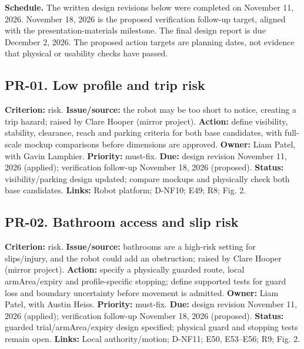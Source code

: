 \documentclass[12pt,letterpaper]{article}
\begin{document}
\textbf{Schedule.} The written design revisions below were completed on November 11, 2026. November 18, 2026 is the proposed verification follow-up target, aligned with the presentation-materials milestone. The final design report is due December 2, 2026. The proposed action targets are planning dates, not evidence that physical or usability checks have passed.

\begin{minipage}{\linewidth}
\subsection*{PR-01. Low profile and trip risk}
\textbf{Criterion:} risk. \textbf{Issue/source:} the robot may be too short to notice, creating a trip hazard; raised by Clare Hooper (mirror project). \textbf{Action:} define visibility, stability, clearance, reach and parking criteria for both base candidates, with full-scale mockup comparisons before dimensions are approved. \textbf{Owner:} Liam Patel, with Gavin Lamphier. \textbf{Priority:} must-fix. \textbf{Due:} design revision November 11, 2026 (applied); verification follow-up November 18, 2026 (proposed). \textbf{Status:} visibility/parking design updated; compare mockups and physically check both base candidates. \textbf{Links:} Robot platform; D-NF10; E49; R8; Fig. 2.
\end{minipage}\par\medskip

\begin{minipage}{\linewidth}
\subsection*{PR-02. Bathroom access and slip risk}
\textbf{Criterion:} risk. \textbf{Issue/source:} bathrooms are a high-risk setting for slips/injury, and the robot could add an obstruction; raised by Clare Hooper (mirror project). \textbf{Action:} specify a physically guarded route, local armArea/expiry and profile-specific stopping; define supported tests for guard loss and boundary uncertainty before movement is admitted. \textbf{Owner:} Liam Patel, with Austin Heiss. \textbf{Priority:} must-fix. \textbf{Due:} design revision November 11, 2026 (applied); verification follow-up November 18, 2026 (proposed). \textbf{Status:} guarded trial/armArea/expiry design specified; physical guard and stopping tests remain open. \textbf{Links:} Local authority/motion; D-NF11; E50, E53--E56; R9; Fig. 2.
\end{minipage}\par\medskip
\end{document}
